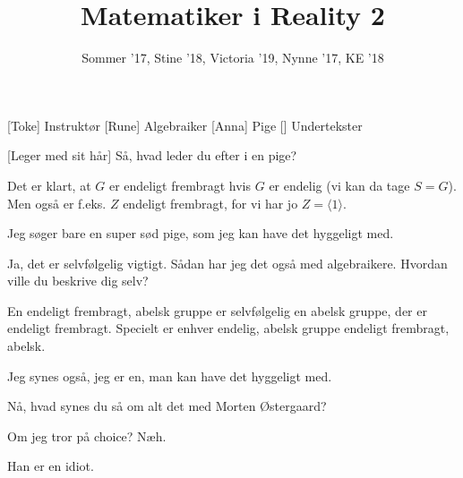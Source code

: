 \documentclass[a4paper,11pt]{article}
\title{Matematiker i Reality 2}
\author{Sommer '17, Stine '18, Victoria '19, Nynne '17, KE '18}
\begin{document}
\maketitle

\begin{roles}
[Toke] Instruktør
[Rune] Algebraiker
[Anna] Pige
[] Undertekster
\end{roles}

\begin{sketch}

[Leger med sit hår] Så, hvad leder du efter i en pige?

 Det er klart, at $G$ er endeligt frembragt hvis $G$ er endelig (vi kan da tage $S = G$). Men også er f.eks. $Z$ endeligt frembragt, for vi har jo $Z = \langle 1 \rangle$.

 Jeg søger bare en super sød pige, som jeg kan have det hyggeligt med.

 Ja, det er selvfølgelig vigtigt. Sådan har jeg det også med algebraikere. Hvordan ville du beskrive dig selv?

 En endeligt frembragt, abelsk gruppe er selvfølgelig en abelsk gruppe, der er endeligt frembragt. Specielt er enhver endelig, abelsk gruppe endeligt frembragt, abelsk.

 Jeg synes også, jeg er en, man kan have det hyggeligt med.


 Nå, hvad synes du så om alt det med Morten Østergaard?

 Om jeg tror på choice? Næh.

 Han er en idiot.
\end{sketch}
\end{document}
